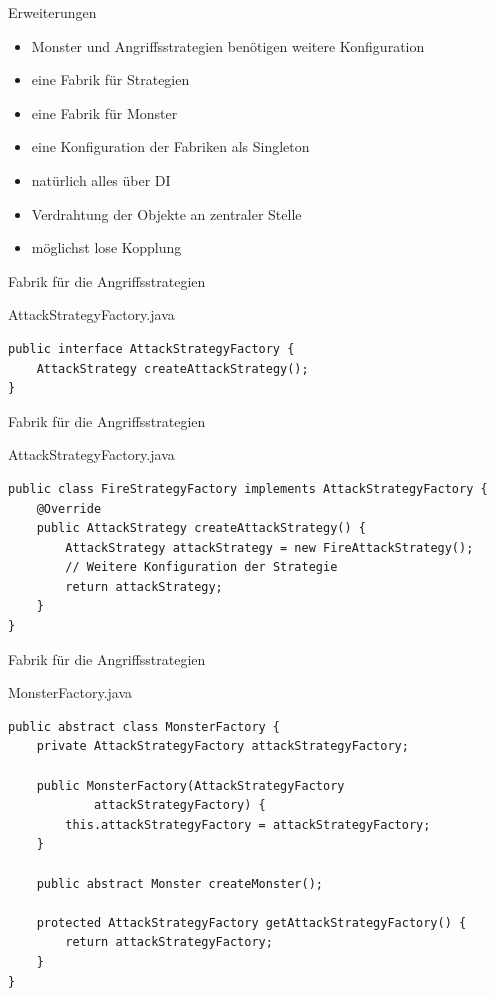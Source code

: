 \begin{frame}{Erweiterungen}
	\begin{itemize}
	  \item Monster und Angriffsstrategien benötigen weitere Konfiguration
	  \item eine Fabrik für Strategien
	  \item eine Fabrik für Monster
	  \item eine Konfiguration der Fabriken als Singleton
	  \item natürlich alles über DI
	  \item Verdrahtung der Objekte an zentraler Stelle
	  \item möglichst lose Kopplung
	\end{itemize}
\end{frame}

\begin{frame}[fragile]{Fabrik für die Angriffsstrategien}
	\begin{exampleblock}{AttackStrategyFactory.java}
		\begin{lstlisting}
public interface AttackStrategyFactory {
	AttackStrategy createAttackStrategy();
}
		\end{lstlisting}
	\end{exampleblock}
\end{frame}

\begin{frame}[fragile]{Fabrik für die Angriffsstrategien}
	\begin{exampleblock}{AttackStrategyFactory.java}
		\begin{lstlisting}
public class FireStrategyFactory implements AttackStrategyFactory {
	@Override
	public AttackStrategy createAttackStrategy() {
		AttackStrategy attackStrategy = new FireAttackStrategy();
		// Weitere Konfiguration der Strategie
		return attackStrategy;
	}
}
		\end{lstlisting}
	\end{exampleblock}
\end{frame}

\begin{frame}[fragile]{Fabrik für die Angriffsstrategien}
	\begin{exampleblock}{MonsterFactory.java}
		\begin{lstlisting}
public abstract class MonsterFactory {
	private AttackStrategyFactory attackStrategyFactory;
	
	public MonsterFactory(AttackStrategyFactory 
			attackStrategyFactory) {
		this.attackStrategyFactory = attackStrategyFactory;
	}
	
	public abstract Monster createMonster();
	
	protected AttackStrategyFactory getAttackStrategyFactory() {
		return attackStrategyFactory;
	}
}
		\end{lstlisting}
	\end{exampleblock}
\end{frame}

